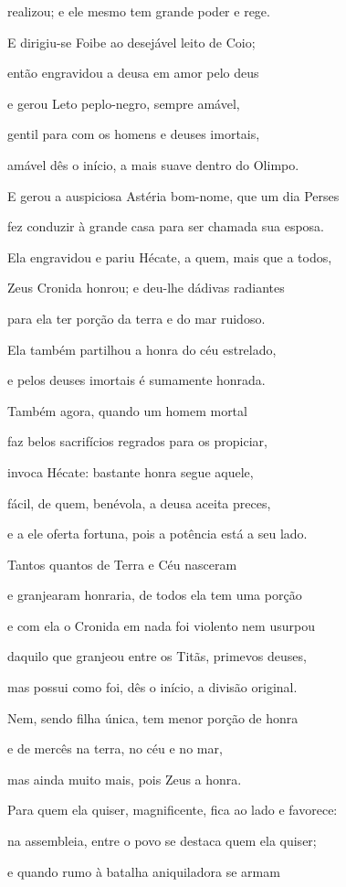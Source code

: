 \begin{pages}
\begin{Rightside}
realizou; e ele mesmo tem grande poder e rege.

\quad{}E dirigiu-se Foibe ao desejável leito de Coio;

então engravidou a deusa em amor pelo deus 

e gerou Leto peplo-negro, sempre amável,

gentil para com os homens e deuses imortais,

amável dês o início, a mais suave dentro do Olimpo.

E gerou a auspiciosa Astéria bom-nome, que um dia Perses

fez conduzir à grande casa para ser chamada sua esposa. 

\quad{}Ela engravidou e pariu Hécate, a quem, mais que a todos,

Zeus Cronida honrou; e deu-lhe dádivas radiantes

para ela ter porção da terra e do mar ruidoso.

Ela também partilhou a honra do céu estrelado,

e pelos deuses imortais é sumamente honrada. 

Também agora, quando um homem mortal

faz belos sacrifícios regrados para os propiciar,

invoca Hécate: bastante honra segue aquele,

fácil, de quem, benévola, a deusa aceita preces,

e a ele oferta fortuna, pois a potência está a seu lado. 

Tantos quantos de Terra e Céu nasceram

e granjearam honraria, de todos ela tem uma porção

e com ela o Cronida em nada foi violento nem usurpou

daquilo que granjeou entre os Titãs, primevos deuses,

mas possui como foi, dês o início, a divisão original. 

Nem, sendo filha única, tem menor porção de honra

e de mercês na terra, no céu e no mar,

mas ainda muito mais, pois Zeus a honra.

Para quem ela quiser, magnificente, fica ao lado e favorece:

na assembleia, entre o povo se destaca quem ela quiser; 

e quando rumo à batalha aniquiladora se armam


\end{Rightside}
\end{pages}
